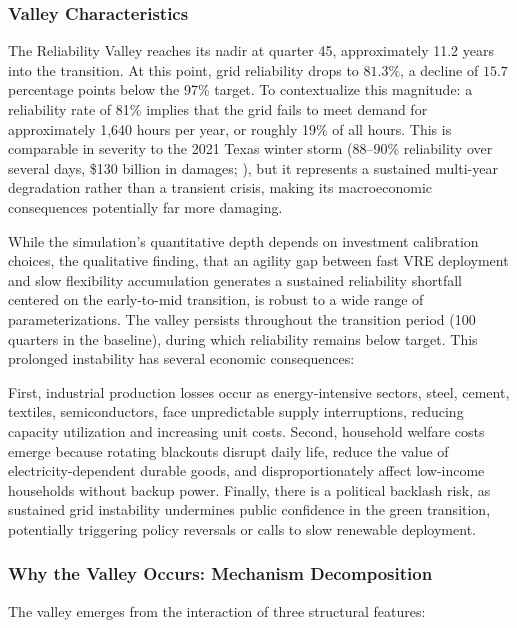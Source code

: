 	\subsubsection{Valley Characteristics}
	
	The Reliability Valley reaches its nadir at quarter 45, approximately 11.2 years into the transition. At this point, grid reliability drops to $81.3\%$, a decline of $15.7$ percentage points below the 97\% target. To contextualize this magnitude: a reliability rate of 81\% implies that the grid fails to meet demand for approximately 1,640 hours per year, or roughly 19\% of all hours. This is comparable in severity to the 2021 Texas winter storm (88--90\% reliability over several days, \$130 billion in damages; \citealp{callaway2018}), but it represents a sustained multi-year degradation rather than a transient crisis, making its macroeconomic consequences potentially far more damaging.
	
	While the simulation's quantitative depth depends on investment calibration choices, the qualitative finding, that an agility gap between fast VRE deployment and slow flexibility accumulation generates a sustained reliability shortfall centered on the early-to-mid transition, is robust to a wide range of parameterizations. The valley persists throughout the transition period (100 quarters in the baseline), during which reliability remains below target. This prolonged instability has several economic consequences:
	
	First, industrial production losses occur as energy-intensive sectors, steel, cement, textiles, semiconductors, face unpredictable supply interruptions, reducing capacity utilization and increasing unit costs. Second, household welfare costs emerge because rotating blackouts disrupt daily life, reduce the value of electricity-dependent durable goods, and disproportionately affect low-income households without backup power. Finally, there is a political backlash risk, as sustained grid instability undermines public confidence in the green transition, potentially triggering policy reversals or calls to slow renewable deployment.
	
	\subsubsection{Why the Valley Occurs: Mechanism Decomposition}
	
	The valley emerges from the interaction of three structural features:
	
